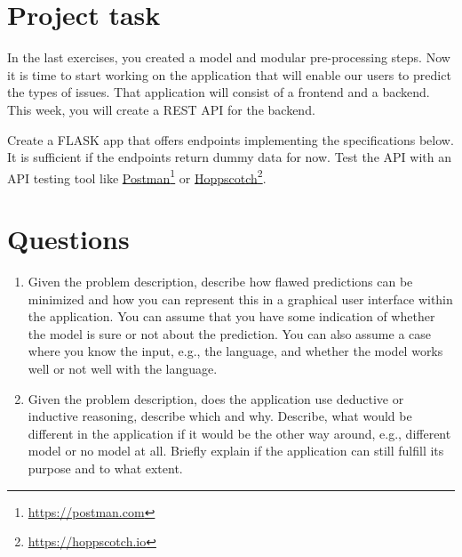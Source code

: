 

\newcommand{\dozenten}{Prof.~Dr.~Steffen Herbold}
\newcommand{\vorlesung}{Principles of AI Engineering}
\newcommand{\docauthor}{Lukas Schulte}
\newcommand{\semester}{}
\newcommand{\blattnummer}{4}
\newcommand{\bistermin}{}



\section*{Project task}

In the last exercises, you created a model and modular pre-processing steps. Now it is time to start working on the application that will enable our users to predict the types of issues. That application will consist of a frontend and a backend. This week, you will create a REST API for the backend.

\vspace{5px}

Create a FLASK app that offers endpoints implementing the specifications below. It is sufficient if the endpoints return dummy data for now. Test the API with an API testing tool like \href{https://postman.com}{Postman}\footnote{\url{https://postman.com}} or \href{https://hoppscotch.io}{Hoppscotch}\footnote{\url{https://hoppscotch.io}}.

\section*{Questions}

\begin{enumerate}
      \item
            Given the problem description, describe how flawed predictions can be minimized and how you can represent this in a graphical user interface within the application.
            You can assume that you have some indication of whether the model is sure or not about the prediction.
            You can also assume a case where you know the input, e.g., the language, and whether the model works well or not well with the language.
      \item
            Given the problem description, does the application use deductive or inductive reasoning, describe which and why.
            Describe, what would be different in the application if it would be the other way around, e.g., different model or no model at all.
            Briefly explain if the application can still fulfill its purpose and to what extent.
\end{enumerate}

